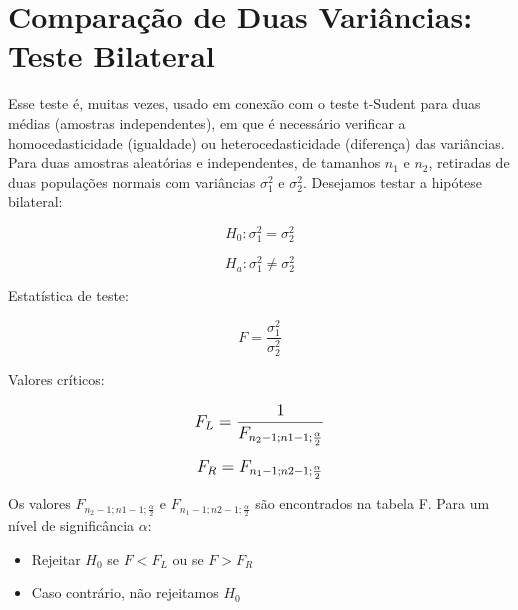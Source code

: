 \section{Comparação de Duas Variâncias: Teste Bilateral}

Esse teste é, muitas vezes, usado em conexão com o teste t-Sudent para duas médias (amostras
independentes), em que é necessário verificar a homocedasticidade (igualdade) ou
heterocedasticidade (diferença) das variâncias. Para duas amostras aleatórias e independentes, de tamanhos \(n_1\) e \(n_2\), retiradas de duas populações normais com variâncias \(\sigma_1^2\) e
\(\sigma_2^2\). Desejamos testar a hipótese bilateral: 

\[H_0: \sigma_1^2 = \sigma_2^2\]

\[H_a: \sigma_1^2 \neq \sigma_2^2\]

Estatística de teste:

\[ F = \frac{\sigma_1^2}{\sigma_2^2} \]

Valores críticos:

\[\beq{ F_L = \frac{1}{F_{n_2-1;n1-1;\frac{\alpha}{2}}} }\]

\[\beq{ F_R = F_{n_1-1;n2-1;\frac{\alpha}{2}} }\]

Os valores \( F_{n_2-1;n1-1;\frac{\alpha}{2}} \) e \(F_{n_1-1;n2-1;\frac{\alpha}{2}}\) são encontrados na  tabela F. Para um nível de significância \(\alpha\):
\begin{itemize}
	\item Rejeitar \(H_0\) se \(F < F_L\) ou se \(F>F_R\)
	\item Caso contrário, não rejeitamos \(H_0\)
\end{itemize} 